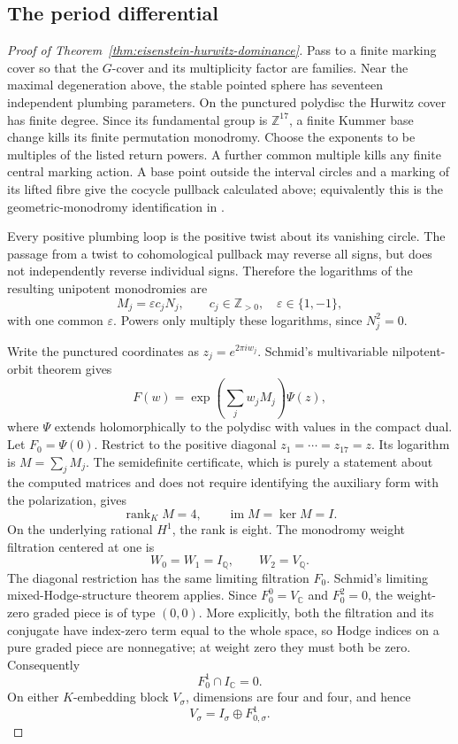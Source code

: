 \documentclass[11pt]{article}
\theoremstyle{definition}
\theoremstyle{remark}
\begin{document}
\subsection{The period differential}

\begin{proof}[Proof of Theorem~\ref{thm:eisenstein-hurwitz-dominance}]
Pass to a finite marking cover so that the \(G\)-cover and its multiplicity
factor are families.  Near the maximal degeneration above, the stable pointed
sphere has seventeen independent plumbing parameters.  On the punctured
polydisc the Hurwitz cover has finite degree.  Since its fundamental group
is \(\mathbb Z^{17}\), a finite Kummer base change kills its finite
permutation monodromy.  Choose the exponents to be multiples of the listed
return powers.  A further common multiple kills any finite central marking
action.  A base point outside the interval circles and a marking of its lifted
fibre give the cocycle pullback calculated above; equivalently this is the
geometric-monodromy identification in
\cite[Lemma~2.2, p.~7, and Theorem~2.5, p.~12]{DettweilerWewers04}.

Every positive plumbing loop is the positive twist about its vanishing
circle.  The passage from a twist to cohomological pullback may reverse all
signs, but does not independently reverse individual signs.  Therefore the
logarithms of the resulting unipotent monodromies are
\[
                        M_j=\varepsilon c_jN_j,
             \qquad c_j\in\mathbb Z_{>0},\quad\varepsilon\in\{1,-1\},
\]
with one common \(\varepsilon\).  Powers only multiply these logarithms,
since \(N_j^2=0\).

Write the punctured coordinates as \(z_j=e^{2\pi i w_j}\).
Schmid's multivariable nilpotent-orbit theorem
\cite[Theorem (4.12), p.~233]{Schmid73} gives
\[
              F(w)=\exp\!\left(\sum_j w_jM_j\right)\Psi(z),
\]
where \(\Psi\) extends holomorphically to the polydisc with values in the
compact dual.  Let \(F_0=\Psi(0)\).  Restrict to the positive diagonal
\(z_1=\cdots=z_{17}=z\).  Its logarithm is \(M=\sum_jM_j\).
The semidefinite certificate, which is purely a statement about the computed
matrices and does not require identifying the auxiliary form with the
polarization, gives
\[
              \operatorname{rank}_K M=4,\qquad
                         \operatorname{im}M=\ker M=I.
\]
On the underlying rational \(H^1\), the rank is eight.  The monodromy weight
filtration centered at one is
\[
                 W_0=W_1=I_{\mathbb Q},\qquad W_2=V_{\mathbb Q}.
\]
The diagonal restriction has the same limiting filtration \(F_0\).
Schmid's limiting mixed-Hodge-structure theorem
\cite[Theorem (6.16), p.~255]{Schmid73} applies.  Since
\(F_0^0=V_{\mathbb C}\) and \(F_0^2=0\), the weight-zero graded piece is
of type \((0,0)\).  More explicitly, both the filtration and its conjugate
have index-zero term equal to the whole space, so Hodge indices on a pure
graded piece are nonnegative; at weight zero they must both be zero.
Consequently
\[
                     F_0^1\cap I_{\mathbb C}=0.
\]
On either \(K\)-embedding block \(V_\sigma\), dimensions are four and four,
and hence
\[
                         V_\sigma=I_\sigma\oplus F_{0,\sigma}^1.
\]


\end{proof}
\end{document}
